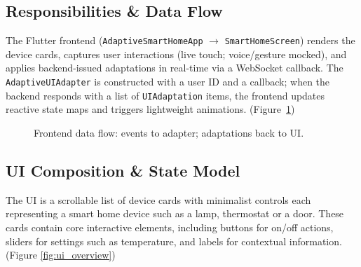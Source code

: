 \subsection{Responsibilities \& Data Flow}
The Flutter frontend (\texttt{AdaptiveSmartHomeApp} $\rightarrow$ \texttt{SmartHomeScreen}) renders the device cards, captures user interactions (live touch; voice/gesture mocked), and applies backend-issued adaptations in real-time via a WebSocket callback. The \texttt{AdaptiveUIAdapter} is constructed with a user ID and a callback; when the backend responds with a list of \texttt{UIAdaptation} items, the frontend updates reactive state maps and triggers lightweight animations. (Figure~\ref{fig:frontend_data_flow})

\begin{figure}[h]
\centering
{}
\caption{Frontend data flow: events to adapter; adaptations back to UI.}
\label{fig:frontend_data_flow}
\end{figure}

\subsection{UI Composition \& State Model}
The UI is a scrollable list of device cards with minimalist controls each representing a smart home device such as a lamp, thermostat or a door. These cards contain core interactive elements, including buttons for on/off actions, sliders for settings such as temperature, and labels for contextual information. (Figure \ref{fig:ui_overview})

